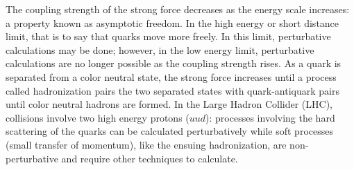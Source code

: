 The coupling strength of the strong force decreases as the energy scale increases: a property known as asymptotic freedom. In the high energy or short distance limit, that is to say that quarks move more freely. In this limit, perturbative calculations may be done; however, in the low energy limit, perturbative calculations are no longer possible as the coupling strength rises. As a quark is separated from a color neutral state, the strong force increases until a process called hadronization pairs the two separated states with quark-antiquark pairs until color neutral hadrons are formed. In the Large Hadron Collider (LHC), collisions involve two high energy protons ($uud$): processes involving the hard scattering of the quarks can be calculated perturbatively while soft processes (small transfer of momentum), like the ensuing hadronization, are non-perturbative and require other techniques to calculate. 

